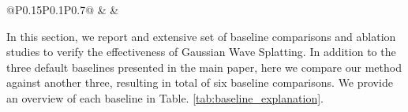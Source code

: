 \begin{table}[!ht]
\begin{tabular}{@{}P{0.15\textwidth}P{0.1\textwidth}P{0.7\textwidth}@{}}
    &  &  \\
   \bottomrule
   \end{tabular}
\caption{\textbf{Baseline methods. } In this table, we describe the input 3D representation and algorithm overview for each baseline method. We compare our Gaussian Wave Splatting algorithm with six other primitives-based CGH baselines.}
\label{tab:baseline_explanation}
\end{table}



In this section, we report and extensive set of baseline comparisons and ablation studies to verify the effectiveness of Gaussian Wave Splatting. In addition to the three default baselines presented in the main paper, here we compare our method against another three, resulting in total of six baseline comparisons. We provide an overview of each baseline in Table. \ref{tab:baseline_explanation}.



